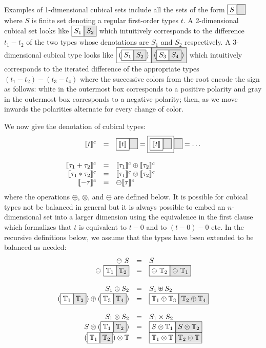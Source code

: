 \documentclass[authoryear,preprint]{sigplanconf}
\newcommand{\cubt}{\mathbb{T}}
\newcommand{\den}[1]{\llbracket #1 \rrbracket}
\newcommand{\denc}[1]{\llbracket #1 \rrbracket^c}
\newcommand{\nodet}[2]{\fcolorbox{black}{white}{$#1$}\fcolorbox{black}{gray!20}{$#2$}}
\begin{document}
Examples of 1-dimensional cubical sets include all the sets of the form
$\nodet{S}{\phantom{\emptyset}}$ where $S$ is finite set denoting a regular
first-order types $t$. A 2-dimensional cubical set looks like
$\nodet{S_1}{S_2}$ which intuitively corresponds to the difference $t_1 -
t_2$ of the two types whose denotations are $S_1$ and $S_2$ respectively. A
3-dimensional cubical type looks like
$\nodet{(\nodet{S_1}{S_2})}{(\nodet{S_3}{S_4})}$ which intuitively
corresponds to the iterated difference of the appropriate types
$(t_1-t_2)-(t_3-t_4)$ where the successive colors from the root encode the
sign as follows: white in the outermost box corresponds to a positive
polarity and gray in the outermost box corresponds to a negative polarity;
then, as we move inwards the polarities alternate for every change of color.

We now give the denotation of cubical types:
\[\begin{array}{rcl}
\denc{t} &=& \nodet{\den{t}}{\phantom{\emptyset}} = 
  \nodet{\nodet{\den{t}}{\phantom{\emptyset}}}{\phantom{\emptyset}} = \ldots \\
\\
\denc{\tau_1 + \tau_2} &=& \denc{\tau_1} \oplus \denc{\tau_2} \\
\denc{\tau_1 * \tau_2} &=& \denc{\tau_1} \otimes \denc{\tau_2} \\
\denc{- \tau} &=& \ominus \denc{\tau}
\end{array}\]
where the operations $\oplus$, $\otimes$, and $\ominus$ are defined below.
It is possible for cubical types not be balanced in general but it is always
possible to embed an $n$-dimensional set into a larger dimension using the
equivalence in the first clause which formalizes that $t$ is equivalent to
$t-0$ and to $(t-0)-0$ etc.  In the recursive definitions below, we assume
that the types have been extended to be balanced as needed:
\[\begin{array}{rcl}
\ominus~S &=& S \\
\ominus~\nodet{\cubt_1}{\cubt_2} &=& \nodet{\ominus~\cubt_2}{\ominus~\cubt_1} \\
\\
S_1 \oplus S_2 &=& S_1 \uplus S_2 \\
(\nodet{\cubt_1}{\cubt_2}) \oplus (\nodet{\cubt_3}{\cubt_4}) &=& 
  \nodet{\cubt_1 \oplus \cubt_3}{\cubt_2 \oplus \cubt_4} \\
\\
S_1 \otimes S_2 &=& S_1 \times S_2 \\
S \otimes (\nodet{\cubt_1}{\cubt_2}) &=& 
  \nodet{S \otimes \cubt_1}{S \otimes \cubt_2} \\
(\nodet{\cubt_1}{\cubt_2}) \otimes \cubt &=& 
  \nodet{\cubt_1 \otimes \cubt}{\cubt_2 \otimes \cubt}
\end{array}\]
\end{document}
